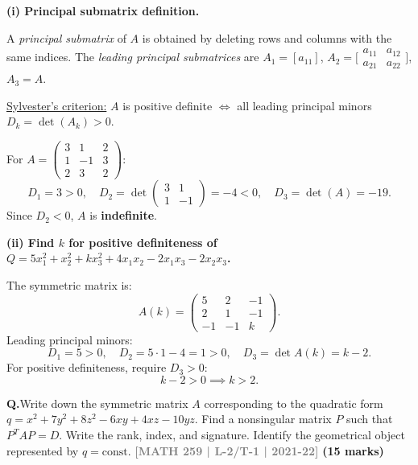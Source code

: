 \documentclass[12pt,a3paper]{article}
\newcommand{\yr}[1]{\hfill\textcolor{gray}{\small\textbf{[#1]}}}
\newcommand{\mk}[1]{\textcolor{orange!70!black}{\small\textbf{(#1 marks)}}}
\newcounter{qnum}
\newcommand{\Q}[1]{%
  \needspace{4\baselineskip}
  \refstepcounter{qnum}
  \vspace{6pt}
  \noindent\textbf{Q\theqnum.}\enspace #1\par
}
\begin{document}
\begin{tcolorbox}[enhanced,breakable,
  colback=cE!4,colframe=cE,boxrule=0.8pt,arc=5pt,
  title={\textbf{Answer --- Principal Submatrices \& Positive Definiteness}},
  fonttitle=\bfseries\color{white},colbacktitle=cE]

\textbf{(i) Principal submatrix definition.}

A \emph{principal submatrix} of $A$ is obtained by deleting rows and columns with the same indices. The \emph{leading principal submatrices} are $A_1=[a_{11}]$, $A_2=\bigl[\begin{smallmatrix}a_{11}&a_{12}\\a_{21}&a_{22}\end{smallmatrix}\bigr]$, $A_3=A$.

\underline{Sylvester's criterion:} $A$ is positive definite $\Leftrightarrow$ all leading principal minors $D_k=\det(A_k)>0$.

For $A=\begin{pmatrix}3&1&2\\1&-1&3\\2&3&2\end{pmatrix}$:
\[
D_1=3>0,\quad D_2=\det\begin{pmatrix}3&1\\1&-1\end{pmatrix}=-4<0,\quad D_3=\det(A)=-19.
\]
Since $D_2<0$, $A$ is \textbf{indefinite}.

\medskip
\textbf{(ii) Find $k$ for positive definiteness of $Q=5x_1^2+x_2^2+kx_3^2+4x_1x_2-2x_1x_3-2x_2x_3$.}

The symmetric matrix is:
\[
A(k)=\begin{pmatrix}5&2&-1\\2&1&-1\\-1&-1&k\end{pmatrix}.
\]
Leading principal minors:
\[
D_1=5>0,\quad D_2=5\cdot1-4=1>0,\quad D_3=\det A(k)=k-2.
\]
For positive definiteness, require $D_3>0$:
\[
k-2>0\implies\boxed{k>2.}
\]

\end{tcolorbox}

\Q{Write down the symmetric matrix $A$ corresponding to the quadratic form $q = x^2 + 7y^2 + 8z^2 - 6xy + 4xz - 10yz$. Find a nonsingular matrix $P$ such that $P^TAP = D$. Write the rank, index, and signature. Identify the geometrical object represented by $q = \text{const}$.
\yr{MATH 259 | L-2/T-1 | 2021-22} \mk{15}}
\end{document}

